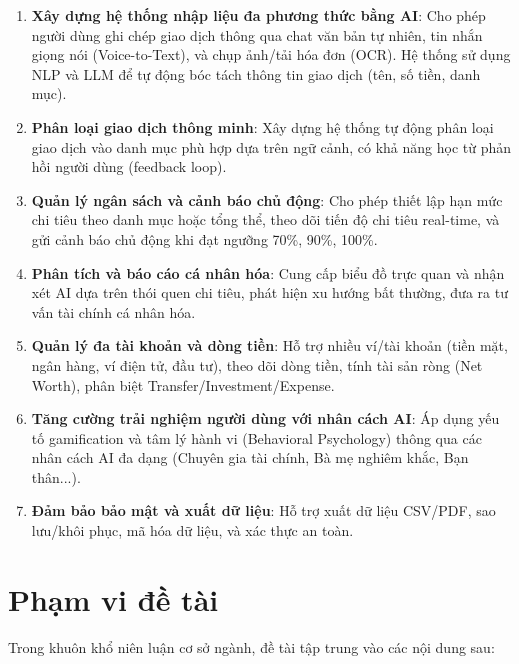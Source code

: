 \begin{enumerate}
    \item \textbf{Xây dựng hệ thống nhập liệu đa phương thức bằng AI}: Cho phép người dùng ghi chép giao dịch thông qua chat văn bản tự nhiên, tin nhắn giọng nói (Voice-to-Text), và chụp ảnh/tải hóa đơn (OCR). Hệ thống sử dụng NLP và LLM để tự động bóc tách thông tin giao dịch (tên, số tiền, danh mục).
    
    \item \textbf{Phân loại giao dịch thông minh}: Xây dựng hệ thống tự động phân loại giao dịch vào danh mục phù hợp dựa trên ngữ cảnh, có khả năng học từ phản hồi người dùng (feedback loop).
    
    \item \textbf{Quản lý ngân sách và cảnh báo chủ động}: Cho phép thiết lập hạn mức chi tiêu theo danh mục hoặc tổng thể, theo dõi tiến độ chi tiêu real-time, và gửi cảnh báo chủ động khi đạt ngưỡng 70\%, 90\%, 100\%.
    
    \item \textbf{Phân tích và báo cáo cá nhân hóa}: Cung cấp biểu đồ trực quan và nhận xét AI dựa trên thói quen chi tiêu, phát hiện xu hướng bất thường, đưa ra tư vấn tài chính cá nhân hóa.
    
    \item \textbf{Quản lý đa tài khoản và dòng tiền}: Hỗ trợ nhiều ví/tài khoản (tiền mặt, ngân hàng, ví điện tử, đầu tư), theo dõi dòng tiền, tính tài sản ròng (Net Worth), phân biệt Transfer/Investment/Expense.
    
    \item \textbf{Tăng cường trải nghiệm người dùng với nhân cách AI}: Áp dụng yếu tố gamification và tâm lý hành vi (Behavioral Psychology) thông qua các nhân cách AI đa dạng (Chuyên gia tài chính, Bà mẹ nghiêm khắc, Bạn thân...).
    
    \item \textbf{Đảm bảo bảo mật và xuất dữ liệu}: Hỗ trợ xuất dữ liệu CSV/PDF, sao lưu/khôi phục, mã hóa dữ liệu, và xác thực an toàn.
\end{enumerate}

\section{Phạm vi đề tài}
\label{sec:scope}

Trong khuôn khổ niên luận cơ sở ngành, đề tài tập trung vào các nội dung sau:

